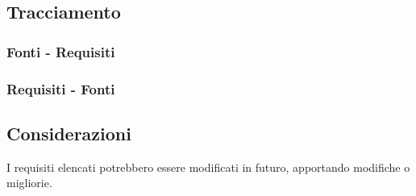 \newpage
\subsection{Tracciamento}
\subsubsection{Fonti - Requisiti}


\newpage
\subsubsection{Requisiti - Fonti}


\subsection{Considerazioni}
I requisiti elencati potrebbero essere modificati in futuro, apportando modifiche o migliorie.

